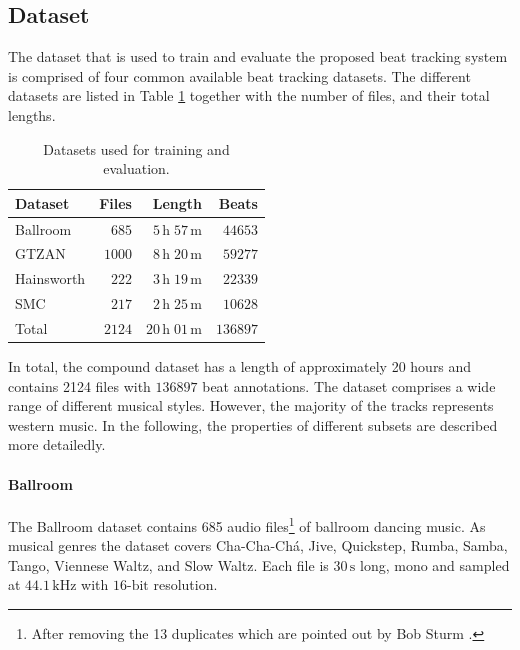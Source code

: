 \documentclass{scrartcl}
\begin{document}
\subsection{Dataset}
The dataset that is used to train and evaluate the proposed beat tracking system is comprised of four common available beat tracking datasets. The different datasets  are listed in Table \ref{tab:datasets} together with the number of files, and their total lengths.
\begin{table}[htbp]
\caption{Datasets used for training and evaluation.}
\label{tab:datasets}
\centering
\begin{tabular}{lrrr}
\hline
\hline
\textbf{Dataset} & \textbf{Files} & \textbf{Length} & \textbf{Beats} \\
\hline
Ballroom \cite{Gouyon2006b, Krebs2013} & $685$ & $5\,\text{h} \;57\,\text{m}$ & $\num{44653}$\\
GTZAN \cite{Tzanetakis2002b, marchand2015swing} & $1000$ & $8\,\text{h}\;20\,\text{m}$ & $\num{59277}$\\
Hainsworth \cite{Hainsworth2004} & $222$ & $3\,\text{h}\;19\,\text{m}$ & $\num{22339}$\\
SMC \cite{Holzapfel2012} & $217$ & $2\,\text{h}\;25\,\text{m}$ & $\num{10628}$\\    
\hline
Total & $2124$ & $ 20\,\text{h}\; 01\,\text{m}$ & $\num{136897}$\\  
\hline
\hline
\end{tabular}
\end{table}  
In total, the compound dataset has a length of approximately 20 hours and contains 2124 files with $\num{136897}$ beat annotations. The dataset comprises a wide range of different musical styles. However, the majority of the tracks represents western music. In the following, the properties of different subsets are described more detailedly.   


\paragraph{Ballroom} 
The Ballroom dataset \cite{Gouyon2006b, Krebs2013} contains 685 audio files\footnote{After removing the 13 duplicates which are pointed out by Bob Sturm \cite{Sturm2014}.} of ballroom dancing music. As musical genres the dataset covers Cha-Cha-Chá, Jive, Quickstep, Rumba, Samba, Tango, Viennese Waltz, and Slow Waltz. Each file is $30\,\text{s}$ long, mono and sampled at $44.1\,\text{kHz}$ with $16\text{-bit}$ resolution.
\end{document}
